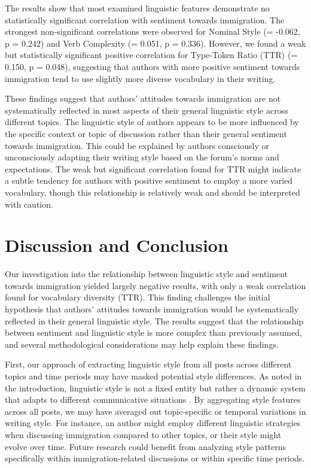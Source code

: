 \documentclass[11pt]{article}
\begin{document}
The results show that most examined linguistic features demonstrate no statistically significant correlation with sentiment towards immigration.
The strongest non-significant correlations were observed for Nominal Style (\rho = -0.062, p = 0.242) and Verb Complexity (\rho = 0.051, p = 0.336).
However, we found a weak but statistically significant positive correlation for Type-Token Ratio (TTR) (\rho = 0.150, p = 0.048), suggesting that authors with more positive sentiment towards immigration tend to use slightly more diverse vocabulary in their writing.

These findings suggest that authors' attitudes towards immigration are not systematically reflected in most aspects of their general linguistic style across different topics.
The linguistic style of authors appears to be more influenced by the specific context or topic of discussion rather than their general sentiment towards immigration.
This could be explained by authors consciously or unconsciously adapting their writing style based on the forum's norms and expectations.
The weak but significant correlation found for TTR might indicate a subtle tendency for authors with positive sentiment to employ a more varied vocabulary, though this relationship is relatively weak and should be interpreted with caution.

\section{Discussion and Conclusion}

Our investigation into the relationship between linguistic style and sentiment towards immigration yielded largely negative results, with only a weak correlation found for vocabulary diversity (TTR).
This finding challenges the initial hypothesis that authors' attitudes towards immigration would be systematically reflected in their general linguistic style.
The results suggest that the relationship between sentiment and linguistic style is more complex than previously assumed, and several methodological considerations may help explain these findings.

First, our approach of extracting linguistic style from all posts across different topics and time periods may have masked potential style differences.
As noted in the introduction, linguistic style is not a fixed entity but rather a dynamic system that adapts to different communicative situations \citep{Biber1988}.
By aggregating style features across all posts, we may have averaged out topic-specific or temporal variations in writing style.
For instance, an author might employ different linguistic strategies when discussing immigration compared to other topics, or their style might evolve over time.
Future research could benefit from analyzing style patterns specifically within immigration-related discussions or within specific time periods.
\end{document}
